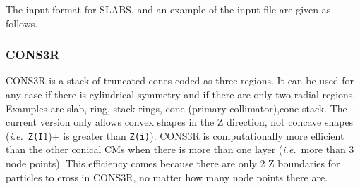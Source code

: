 \documentclass[12pt,twoside]{article}
\newcommand{\ie}{{\em i.e.}}
\begin{document}
\clearpage

The input format for SLABS, and an example of the input file are given as
follows.

\begin{small}

\end{small}






\subsubsection{CONS3R}
\renewcommand{\rightmark}{CONS3R CM}
\label{sCONS3R}

CONS3R is a stack of truncated cones coded as three regions.  It can be used
for any case if there is cylindrical symmetry and if there are only two
radial regions. Examples are slab, ring, stack rings, cone (primary
collimator),cone stack. The current version only allows convex shapes in
the Z direction, not concave shapes (\ie\ \verb+Z(I+1)+ is greater than
\verb+Z(i)+).  CONS3R is computationally more efficient than the other
conical CMs when there is more than one layer (\ie\ more than 3 node
points). This efficiency comes because there are only 2 Z boundaries for
particles to cross in CONS3R, no matter how many node points there are.
\end{document}
